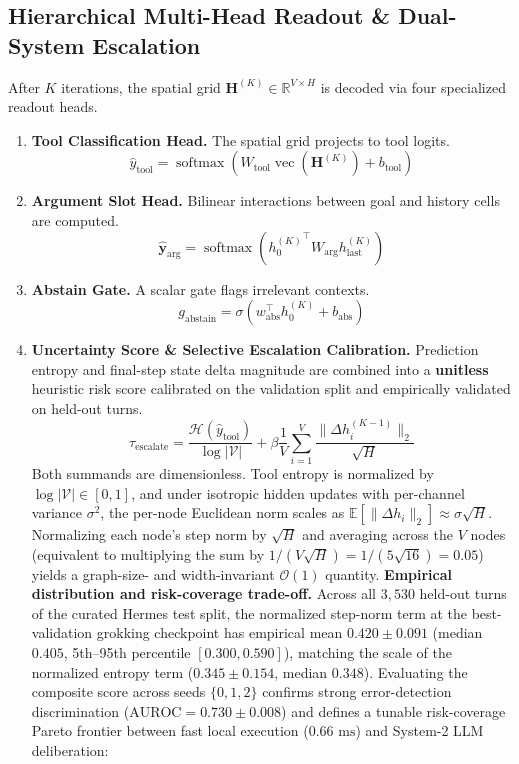 \documentclass[10pt,twocolumn,letterpaper]{article}
\begin{document}
\subsection{Hierarchical Multi-Head Readout \& Dual-System Escalation}\label{sec:dual-system}
After $K$ iterations, the spatial grid $\mathbf{H}^{(K)} \in \mathbb{R}^{V \times H}$ is decoded via four specialized readout heads.
\begin{enumerate}[leftmargin=1.5em, itemsep=0.1em]
  \item \textbf{Tool Classification Head.} The spatial grid projects to tool logits.
  \begin{equation}
    \hat{y}_{\text{tool}} = \operatorname{softmax}\left(W_{\text{tool}} \operatorname{vec}(\mathbf{H}^{(K)}) + b_{\text{tool}}\right)
  \end{equation}
  \item \textbf{Argument Slot Head.} Bilinear interactions between goal and history cells are computed.
  \begin{equation}
    \hat{\mathbf{y}}_{\text{arg}} = \operatorname{softmax}\left({h_0^{(K)}}^\top W_{\text{arg}} h_{\text{last}}^{(K)}\right)
  \end{equation}
  \item \textbf{Abstain Gate.} A scalar gate flags irrelevant contexts.
  \begin{equation}
    g_{\text{abstain}} = \sigma\left(w_{\text{abs}}^\top h_0^{(K)} + b_{\text{abs}}\right)
  \end{equation}
  \item \textbf{Uncertainty Score \& Selective Escalation Calibration.} Prediction entropy and final-step state delta magnitude are combined into a \textbf{unitless} heuristic risk score calibrated on the validation split and empirically validated on held-out turns.
  \begin{equation}\label{eq:escalate}
    \tau_{\text{escalate}} = \frac{\mathcal{H}(\hat{y}_{\text{tool}})}{\log |\mathcal{V}|} + \beta \frac{1}{V} \sum_{i=1}^V \frac{\|\Delta h_i^{(K-1)}\|_2}{\sqrt{H}}
  \end{equation}
  Both summands are dimensionless. Tool entropy is normalized by $\log |\mathcal{V}| \in [0, 1]$, and under isotropic hidden updates with per-channel variance $\sigma^2$, the per-node Euclidean norm scales as $\mathbb{E}[\|\Delta h_i\|_2] \approx \sigma \sqrt{H}$. Normalizing each node's step norm by $\sqrt{H}$ and averaging across the $V$ nodes (equivalent to multiplying the sum by $1/(V\sqrt{H}) = 1/(5\sqrt{16}) = 0.05$) yields a graph-size- and width-invariant $\mathcal{O}(1)$ quantity. \textbf{Empirical distribution and risk-coverage trade-off.} Across all $3{,}530$ held-out turns of the curated Hermes test split, the normalized step-norm term at the best-validation grokking checkpoint has empirical mean $0.420 \pm 0.091$ (median $0.405$, 5th--95th percentile $[0.300, 0.590]$), matching the scale of the normalized entropy term ($0.345 \pm 0.154$, median $0.348$). Evaluating the composite score across seeds $\{0,1,2\}$ confirms strong error-detection discrimination ($\text{AUROC} = \mathbf{0.730 \pm 0.008}$) and defines a tunable risk-coverage Pareto frontier between fast local execution ($0.66\text{ ms}$) and System-2 LLM deliberation:

\end{enumerate}
\end{document}
